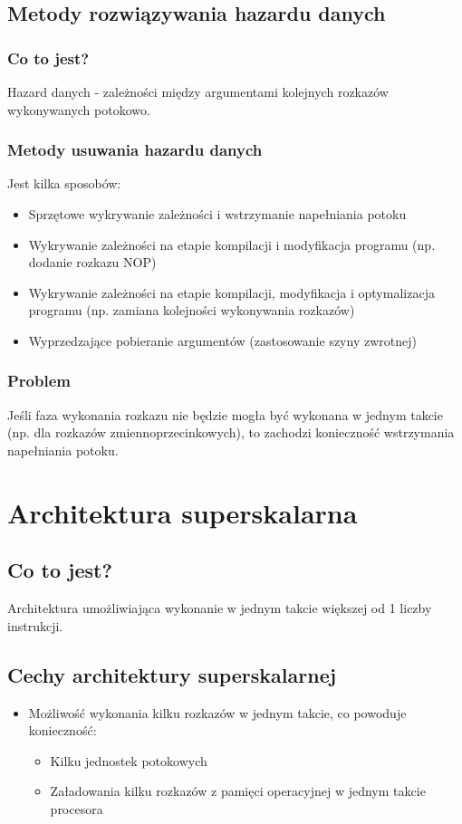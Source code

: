    \subsection*{Metody rozwiązywania hazardu danych}
	   \subsubsection*{Co to jest?}
	   Hazard danych - zależności między argumentami kolejnych rozkazów wykonywanych potokowo.
	   \subsubsection*{Metody usuwania hazardu danych}
	   Jest kilka sposobów:
	   \begin{itemize}
	   		\item Sprzętowe wykrywanie zależności i wstrzymanie napełniania potoku
	   		\item Wykrywanie zależności na etapie kompilacji i modyfikacja programu (np. dodanie rozkazu NOP)
	   		\item Wykrywanie zależności na etapie kompilacji, modyfikacja i optymalizacja programu (np. zamiana kolejności wykonywania rozkazów)
	   		\item Wyprzedzające pobieranie argumentów (zastosowanie szyny zwrotnej)
	   \end{itemize}
	   \subsubsection*{Problem}
		Jeśli faza wykonania rozkazu nie będzie mogła być wykonana w jednym takcie (np. dla rozkazów zmiennoprzecinkowych), to zachodzi konieczność wstrzymania napełniania potoku.
	        	
	
    \section*{Architektura superskalarna}
	    \subsection*{Co to jest?}
	    Architektura umożliwiająca wykonanie w jednym takcie większej od 1 liczby instrukcji.
    	\subsection*{Cechy architektury superskalarnej}
        	\begin{itemize}
            \item Możliwość wykonania kilku rozkazów w jednym takcie, co powoduje konieczność:
	            \begin{itemize}
	            	\item Kilku jednostek potokowych
	            	\item Załadowania kilku rozkazów z pamięci operacyjnej w jednym takcie procesora
	            \end{itemize}
	        
            \end{itemize}
		
